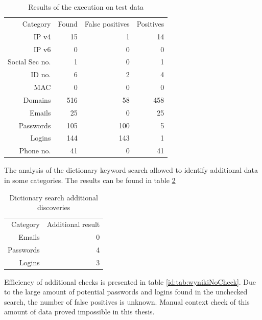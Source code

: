 \documentclass[a4paper,twoside,12pt]{book}
\begin{document}
\begin{table}
   \centering
   \caption{Results of the execution on test data}
   \label{id:tab:wyniki}
   \begin{tabular}{rrrr}
   \toprule
      Category       &   Found &   False positives & Positives \\
      IP v4          &      15 &                 1 &        14 \\
      IP v6          &       0 &                 0 &         0 \\
      Social Sec no. &       1 &                 0 &         1 \\
      ID no.         &       6 &                 2 &         4 \\
      MAC            &       0 &                 0 &         0 \\
      Domains        &     516 &                58 &       458 \\
      Emails         &      25 &                 0 &        25 \\
      Passwords      &     105 &               100 &         5 \\
      Logins         &     144 &               143 &         1 \\
      Phone no.      &      41 &                 0 &        41 \\
   \bottomrule
   \end{tabular}
   \end{table}  

The analysis of the dictionary keyword search allowed to identify additional data in some categories. The results can be found in table \ref{id:tab:wynikiDictionary}

\begin{table}
   \centering
   \caption{Dictionary search additional discoveries}
   \label{id:tab:wynikiDictionary}
   \begin{tabular}{rr}
   \toprule
      Category       &   Additional result \\
      Emails         &                   0 \\
      Passwords      &                   4 \\
      Logins         &                   3 \\
   \bottomrule
   \end{tabular}
   \end{table} 

Efficiency of additional checks is presented in table \ref{id:tab:wynikiNoCheck}. Due to the large amount of potential passwords and logins
found in the unchecked search, the number of false positives is unknown. Manual context check of this amount of data proved impossible in this 
thesis.
\end{document}
